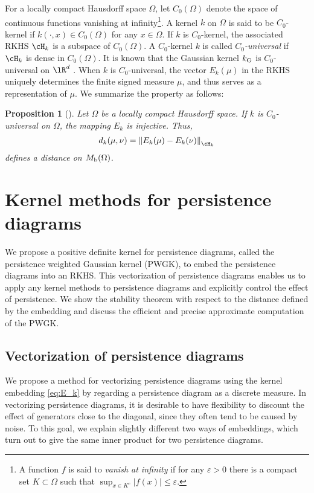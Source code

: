 \documentclass{article}
\newtheorem{prop}[thm]{Proposition}
\newcommand{\ee}{{\varepsilon}}
\providecommand{\norm}[1]{\left\lVert#1\right\rVert}
\begin{document}
For a locally compact Hausdorff space $\Omega$, let $C_{0}(\Omega)$ denote the space of continuous functions vanishing at infinity\footnote{A function $f$ is said to {\em vanish at infinity} if for any $\ee >0$ there is a compact set $K \subset \Omega$ such that $\sup_{x \in K^{c}} |f(x)| \leq \ee$.}.
A kernel $k$ on $\Omega$ is said to be $C_{0}$-kernel if $k(\cdot,x) \in C_{0}(\Omega)$ for any $x \in \Omega$.
If $k$ is $C_{0}$-kernel, the associated RKHS $\cH_{k}$ is a subspace of $C_{0}(\Omega)$.
A $C_{0}$-kernel $k$ is called {\em $C_{0}$-universal} if $\cH_{k}$ is dense in $C_{0}(\Omega)$.
It is known that the Gaussian kernel $k_{{\rm G}}$ is $C_{0}$-universal on $\lR^{d}$ \cite{SFL11}.
When $k$ is $C_{0}$-universal, the vector $E_k(\mu)$ in the RKHS uniquely determines the finite signed measure $\mu$, and thus serves as a representation of $\mu$. We summarize the property as follows:
\begin{prop}[\cite{SFL11}]
\label{prop:C0_distance}
Let $\Omega$ be a locally compact Hausdorff space.
If $k$ is $C_{0}$-universal on $\Omega$, the mapping $E_{k}$ is injective. Thus,
\[
d_{k}(\mu,\nu)=\norm{E_{k}(\mu)-E_{k}(\nu)}_{\cH_{k}}
\]
defines a distance on $M_{{\rm b}}(\Omega)$.
\end{prop}



\section{Kernel methods for persistence diagrams}
\label{sec:pdkernel}
We propose a positive definite kernel for persistence diagrams, called the persistence weighted Gaussian kernel (PWGK), to embed the persistence diagrams into an RKHS.
This vectorization of persistence diagrams enables us to apply any kernel methods to persistence diagrams and explicitly control the effect of persistence.
We show the stability theorem with respect to the distance defined by the embedding and discuss the efficient and precise approximate computation of the PWGK.   


\subsection{Vectorization of persistence diagrams}
\label{subsec:vectorization}

We propose a method for vectorizing persistence diagrams using the kernel embedding \eqref{eq:E_k} by regarding a persistence diagram as a discrete measure.
In vectorizing persistence diagrams, it is desirable to have flexibility to discount the effect of generators close to the diagonal, since they often tend to be caused by noise.
To this goal, we explain slightly different two ways of embeddings, which turn out to give the same inner product for two persistence diagrams. 
\end{document}
